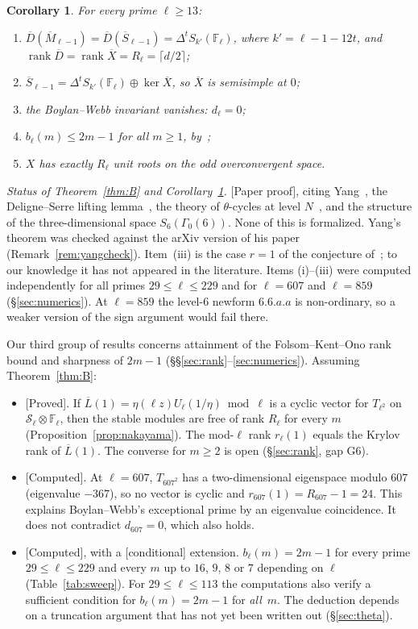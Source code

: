 \documentclass[11pt]{amsart}
\newcommand{\Fl}{\mathbb{F}_\ell}
\newcommand{\Sb}{\overline{S}}
\newcommand{\Mb}{\overline{M}}
\newcommand{\Db}{\overline{D}}
\newcommand{\Xb}{\overline{X}}
\newcommand{\Lb}{\overline{L}}
\newcommand{\cS}{\mathcal{S}}
\DeclareMathOperator{\rank}{rank}
\newcommand{\st}[1]{\textup{\textsf{[#1]}}}
\theoremstyle{plain}
\newtheorem{corollary}[theorem]{Corollary}
\theoremstyle{definition}
\numberwithin{equation}{section}
\begin{document}
\begin{corollary}\label{cor:dl}
For every prime $\ell\ge13$:
\begin{enumerate}[label=(\roman*)]
  \item $\Db(\Mb_{\ell-1})=\Db(\Sb_{\ell-1})=\Delta^t S_{k'}(\Fl)$, where $k'=\ell-1-12t$, and
        $\rank\Db=\rank\Xb=R_\ell=\lceil d/2\rceil$;
  \item $\Sb_{\ell-1}=\Delta^tS_{k'}(\Fl)\oplus\ker\Xb$, so $\Xb$ is semisimple at $0$;
  \item the Boylan--Webb invariant vanishes: $d_\ell=0$;
  \item $b_\ell(m)\le 2m-1$ for all $m\ge1$, by~\cite[Thm.~1.2]{BoylanWebb2013};
  \item $X$ has exactly $R_\ell$ unit roots on the odd overconvergent space.
\end{enumerate}
\end{corollary}
\noindent\emph{Status of Theorem~\ref{thm:B} and Corollary~\ref{cor:dl}.} \st{Paper proof}, citing
Yang~\cite[Thm.~1]{Yang2014}, the Deligne--Serre lifting lemma~\cite{DeligneSerre1974}, the theory of $\theta$-cycles
at level $N$~\cite{Jochnowitz1982,Katz1977,Edixhoven1992}, and the structure of the three-dimensional space
$S_6(\Gamma_0(6))$. None of this is formalized. Yang's theorem was checked against the arXiv version of his paper
(Remark~\ref{rem:yangcheck}). Item~(iii) is the case $r=1$ of the conjecture of~\cite[\S5]{BLMT2014}; to our knowledge
it has not appeared in the literature. Items (i)--(iii) were computed independently for all primes
$29\le\ell\le 229$ and for $\ell=607$ and $\ell=859$ (\S\ref{sec:numerics}). At $\ell=859$ the level-$6$ newform
$6.6.a.a$ is non-ordinary, so a weaker version of the sign argument would fail there.

\medskip
Our third group of results concerns attainment of the Folsom--Kent--Ono rank bound and sharpness of $2m-1$
(\S\S\ref{sec:rank}--\ref{sec:numerics}). Assuming Theorem~\ref{thm:B}:
\begin{itemize}
\item \st{Proved}. If $\Lb(1)=\eta(\ell z)U_\ell(1/\eta)\bmod\ell$ is a cyclic vector for $T_{\ell^2}$ on
$\cS_\ell\otimes\Fl$, then the stable modules are free of rank $R_\ell$ for every $m$ (Proposition~\ref{prop:nakayama}).
The mod-$\ell$ rank $r_\ell(1)$ equals the Krylov rank of $\Lb(1)$. The converse for $m\ge2$ is open
(\S\ref{sec:rank}, gap G6).
\item \st{Computed}. At $\ell=607$, $T_{607^2}$ has a two-dimensional eigenspace modulo $607$ (eigenvalue $-367$), so no
vector is cyclic and $r_{607}(1)=R_{607}-1=24$. This explains Boylan--Webb's exceptional prime by an eigenvalue
coincidence. It does not contradict $d_{607}=0$, which also holds.
\item \st{Computed}, with a \st{conditional} extension. $b_\ell(m)=2m-1$ for every prime $29\le\ell\le229$ and every
$m$ up to $16$, $9$, $8$ or $7$ depending on $\ell$ (Table~\ref{tab:sweep}). For $29\le\ell\le113$ the computations
also verify a sufficient condition for $b_\ell(m)=2m-1$ for \emph{all}~$m$. The deduction depends on a truncation
argument that has not yet been written out (\S\ref{sec:theta}).
\end{itemize}
\end{document}
